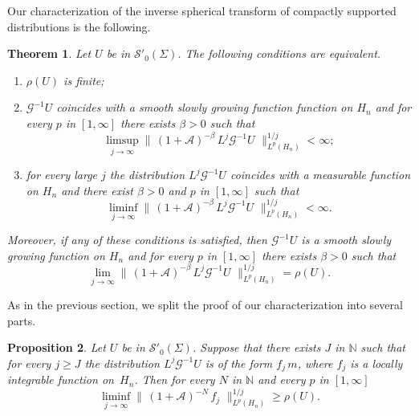 \documentclass[12pt,a4paper]{amsart}
\theoremstyle{plain}
\newtheorem{theorem}{Theorem}[section]
\newtheorem{proposition}[theorem]{Proposition}
\theoremstyle{definition}
\numberwithin{equation}{section}
\begin{document}
Our characterization of the inverse spherical transform of compactly 
supported distributions is the following.

 \begin{theorem}\label{maininv}
Let $U$ be in ${\mathcal S}'_0(\Sigma)$. The following conditions are equivalent.
\begin{enumerate}
\item
${\rho}(U)$ is finite; 

\item  
${\mathcal G}^{-1}U$ coincides with a smooth slowly growing function function
on ${{H_{n}}}$ and for every $p$ in $[1,\infty]$ there exists $\beta>0$ such that
$$
\limsup_{j\to\infty}
\|\,(1+{\mathcal A})^{-\beta}\,L^j{\mathcal G}^{-1}U\,\,\|_{L^p({{H_{n}}})}^{1/j}
 <\infty;
$$
 
\item 
 for every large $j$  the distribution
$ L^j {\mathcal G}^{-1}U$ coincides with a measurable function
on ${{H_{n}}}$   and there exist $\beta>0$ and $p$ in $[1,\infty]$
such that
$$
\liminf_{j\to\infty} 
\|\,(1+{\mathcal A})^{-\beta}\,L^j{\mathcal G}^{-1}U\,\,\|_{L^p({{H_{n}}})}^{1/j}
<\infty .
$$ 

\end{enumerate}
Moreover, if any of these conditions is satisfied, then ${\mathcal G}^{-1}U$
 is a smooth slowly growing function on ${{H_{n}}}$
and for every $p$ in $[1,\infty]$ there exists $\beta>0$ such that
\begin{equation}\label{rhospettr}
\lim_{j\to\infty} \|\,(1+{\mathcal A})^{-\beta}\,L^j{\mathcal G}^{-1}U\,\,\|_{L^p({{H_{n}}})}^{1/j}= {\rho}(U).
\end{equation}
\end{theorem}

As in the previous section, we split the proof of our characterization into several parts.

 \begin{proposition}\label{inf}
 Let $U$ be in ${\mathcal S}'_0({\Sigma})$.   
Suppose that there exists  $J$ in ${\mathbb N}$ such that
  for every 
 $j\geq J$ the distribution $ L^j {\mathcal G}^{-1} U$ is of the form $f_j\,{m} $, where $f_j$ is 
 a locally integrable function on~${{H_{n}}}$. Then for every $N$ in ${\mathbb N}$
and every $p$ in $[1,\infty]$
  $$
 \liminf_{j\to\infty} 
\|\,(1+{\mathcal A})^{-N}\,f_j\,\,\|_{L^p({{H_{n}}})}^{1/j}
\geq {\rho}(U).
 $$
 \end{proposition}
 
\end{document}
